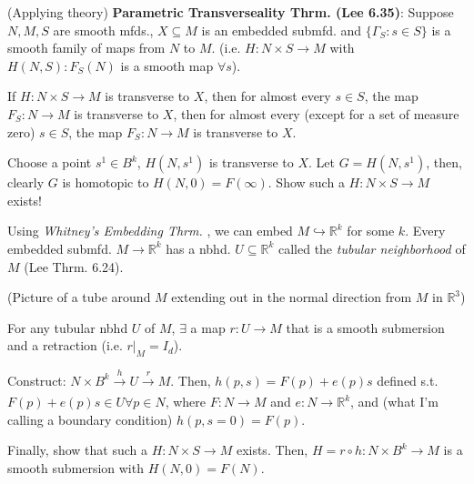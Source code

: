 \documentclass[12pt,letterpaper]{article}
\begin{document}
(Applying theory) \textbf{Parametric Transverseality Thrm. (Lee 6.35)}: Suppose $N,M,S$ are smooth mfds., $X \subseteq M$ is an embedded submfd. and $\{ \Gamma_S : s \in S \}$ is a smooth family of maps from $N$ to $M$. (i.e. $H: N \times S \rightarrow M$ with $H(N, S) : F_S(N)$ is a smooth map $\forall s$).

If $H: N \times S \rightarrow M$ is transverse to $X$, then for almost every $s \in  S$, the map $F_S : N \rightarrow M$ is transverse to $X$, then for almost every (except for a set of measure zero) $s \in S$, the map $F_S: N \rightarrow M$ is transverse to $X$. 

Choose a point $s^1 \in B^k$, $H(N, s^1)$ is transverse to $X$. Let $G = H(N, s^1)$, then, clearly $G$ is homotopic to $H(N, 0) = F(\infty)$. Show such a $H: N \times S \rightarrow M$ exists!

Using \textit{Whitney's Embedding Thrm. }, we can embed $M \hookrightarrow \mathbb{R}^k$ for some $k$. Every embedded submfd. $M \rightarrow \mathbb{R}^k$ has a nbhd. $U \subseteq \mathbb{R}^k$ called the \textit{tubular neighborhood} of $M$ (Lee Thrm. 6.24). 

(Picture of a tube around $M$ extending out in the normal direction from $M$ in $\mathbb{R}^3$)

For any tubular nbhd $U$ of $M$, $\exists$ a map $r: U \rightarrow M$ that is a smooth submersion and a retraction (i.e. $r|_M = I_d$).

Construct: $N \times B^k \xrightarrow[]{h} U \xrightarrow[]{r} M$. Then, $h(p,s) = F(p) + e(p)s$ defined s.t. $F(p) + e(p) s \in U \forall p \in N$, where $F: N \rightarrow M$ and $e: N \rightarrow \mathbb{R}^k$, and (what I'm calling a boundary condition) $h(p,s=0) = F(p)$. 

Finally, show that such a $H: N \times S \rightarrow M$ exists. Then, $H = r \circ h: N \times B^k \rightarrow M$ is a smooth submersion with $H(N, 0) = F(N)$.
\end{document}

